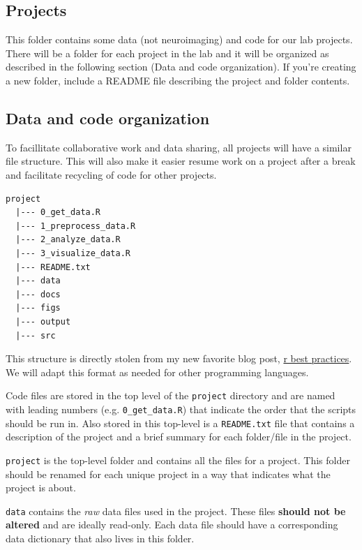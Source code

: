 \documentclass[]{book}
\begin{document}
\hypertarget{projects}{%
\subsection{Projects}\label{projects}}

This folder contains some data (not neuroimaging) and code for our lab projects. There will be a folder for each project in the lab and it will be organized as described in the following section (Data and code organization). If you're creating a new folder, include a README file describing the project and folder contents.

\hypertarget{data-and-code-organization}{%
\subsection{Data and code organization}\label{data-and-code-organization}}

To facillitate collaborative work and data sharing, all projects will have a similar file structure. This will also make it easier resume work on a project after a break and facilitate recycling of code for other projects.

\begin{verbatim}
project 
  |--- 0_get_data.R
  |--- 1_preprocess_data.R
  |--- 2_analyze_data.R
  |--- 3_visualize_data.R
  |--- README.txt
  |--- data
  |--- docs
  |--- figs
  |--- output
  |--- src
\end{verbatim}

This structure is directly stolen from my new favorite blog post, \href{https://kdestasio.github.io/post/r_best_practices/}{r best practices}. We will adapt this format as needed for other programming languages.

Code files are stored in the top level of the \texttt{project} directory and are named with leading numbers (e.g. \texttt{0\_get\_data.R}) that indicate the order that the scripts should be run in. Also stored in this top-level is a \texttt{README.txt} file that contains a description of the project and a brief summary for each folder/file in the project.

\texttt{project} is the top-level folder and contains all the files for a project. This folder should be renamed for each unique project in a way that indicates what the project is about.

\texttt{data} contains the \emph{raw} data files used in the project. These files \textbf{should not be altered} and are ideally read-only. Each data file should have a corresponding data dictionary that also lives in this folder.
\end{document}
